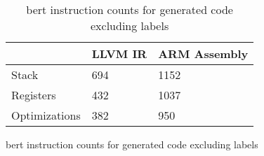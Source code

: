 \begin{table}[h!]
\centering
\begin{tabular}{p{}p{}p{}}
  \hline
 & LLVM IR & ARM Assembly \\ 
  \hline
Stack & 694 & 1152 \\ 
  Registers & 432 & 1037 \\ 
  Optimizations & 382 & 950 \\ 
   \hline
\end{tabular}
\caption{bert instruction counts for generated code excluding labels}
\caption{bert instruction counts for generated code excluding labels}
\end{table}
